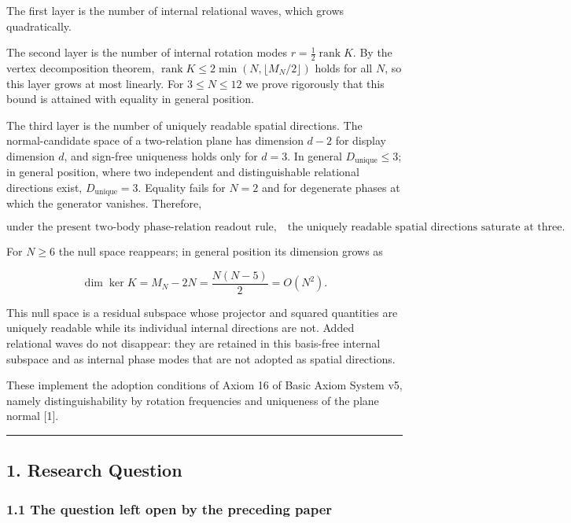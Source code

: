 \documentclass[
  a4paper,
]{article}
\begin{document}
The first layer is the number of internal relational waves, which grows
quadratically.

The second layer is the number of internal rotation modes
\(r=\frac12\operatorname{rank}K\). By the vertex decomposition theorem,
\(\operatorname{rank}K\le2\min(N,\lfloor M_N/2\rfloor)\) holds for all
\(N\), so this layer grows at most linearly. For \(3\le N\le12\) we
prove rigorously that this bound is attained with equality in general
position.

The third layer is the number of uniquely readable spatial directions.
The normal-candidate space of a two-relation plane has dimension \(d-2\)
for display dimension \(d\), and sign-free uniqueness holds only for
\(d=3\). In general \(D_{\mathrm{unique}}\le3\); in general position,
where two independent and distinguishable relational directions exist,
\(D_{\mathrm{unique}}=3\). Equality fails for \(N=2\) and for degenerate
phases at which the generator vanishes. Therefore,

\[
\boxed{
\text{under the present two-body phase-relation readout rule,}
\quad
\text{the uniquely readable spatial directions saturate at three.}
}
\]

For \(N\ge6\) the null space reappears; in general position its
dimension grows as

\[
\dim\ker K=M_N-2N=\frac{N(N-5)}{2}=O(N^2).
\]

This null space is a residual subspace whose projector and squared
quantities are uniquely readable while its individual internal
directions are not. Added relational waves do not disappear: they are
retained in this basis-free internal subspace and as internal phase
modes that are not adopted as spatial directions.

These implement the adoption conditions of Axiom 16 of Basic Axiom
System v5, namely distinguishability by rotation frequencies and
uniqueness of the plane normal {[}1{]}.

\begin{center}\rule{0.5\linewidth}{0.5pt}\end{center}

\subsection{1. Research Question}\label{research-question}

\subsubsection{1.1 The question left open by the preceding
paper}\label{the-question-left-open-by-the-preceding-paper}
\end{document}
